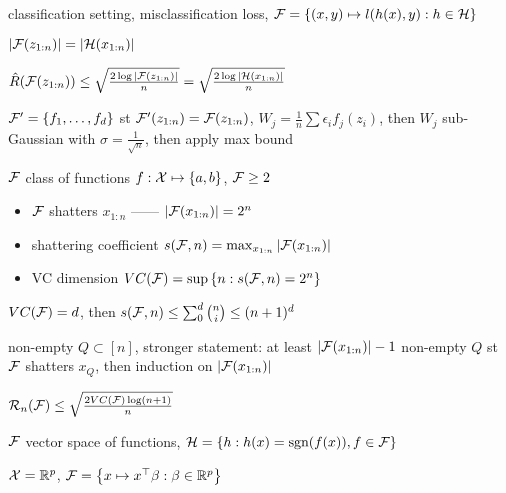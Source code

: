 \begin{setting}
    classification setting, misclassification loss, $\mathcal{F} = \left\{ (x, y) \mapsto l(h(x), y) : h \in \mathcal{H}\right\}$
\end{setting}
\begin{fact}
    $|\mathcal{F}(z_{1:n})| = |\mathcal{H}(x_{1:n})|$
\end{fact}

\begin{lemma}
    $\hat R(\mathcal{F}(z_{1:n})) \leq \sqrt{\frac{2 \log |\mathcal{F}(z_{1:n})|}{n}} = \sqrt{\frac{2 \log |\mathcal{H}(x_{1:n})|}{n}}$
\end{lemma}
\begin{pf}
    $\mathcal{F}' = \left\{ f_1, \dots, f_d \right\}$ st $\mathcal{F}'(z_{1:n}) = \mathcal{F}(z_{1:n})$, $W_j = \frac{1}{n} \sum \epsilon_i f_j(z_i)$,
    then $W_j$ sub-Gaussian with $\sigma = \frac{1}{\sqrt{n}}$, then apply max bound
\end{pf}

\begin{setting}
    $\mathcal{F}$ class of functions $f : \mathcal{X} \mapsto \left\{ a, b \right\}$, $\mathcal{F} \geq 2$
\end{setting}

\begin{itemize}
    \item $\mathcal{F}$ shatters $x_{1:n}$ ------ $|\mathcal{F}(x_{1:n})| = 2^n$
    \item shattering coefficient $s(\mathcal{F}, n) = \max_{x_{1:n}} |\mathcal{F}(x_{1:n})|$
    \item VC dimension $VC(\mathcal{F}) = \sup \left\{ n : s(\mathcal{F}, n) = 2^n \right\}$
\end{itemize}

\begin{lemma}
    $VC(\mathcal{F}) = d$, then $s(\mathcal{F}, n) \leq \sum_0^d {n \choose i} \leq (n+1)^d$
\end{lemma}
\begin{pf}
    non-empty $Q \subset [n]$, stronger statement: at least $|\mathcal{F}(x_{1:n})| - 1$ non-empty $Q$ st $\mathcal{F}$ shatters $x_Q$,
    then induction on $|\mathcal{F}(x_{1:n})|$
\end{pf}

\begin{fact}
    $\mathcal{R}_n(\mathcal{F}) \leq \sqrt{\frac{2 VC(\mathcal{F}) \log(n+1)}{n}}$
\end{fact}

\begin{setting}
    $\mathcal{F}$ vector space of functions, $\mathcal{H} = \left\{ h : h(x) = \textnormal{sgn}(f(x)), f\in \mathcal{F} \right\}$
\end{setting}
\begin{example}
    $\mathcal{X} = \mathbb{R}^p$, $\mathcal{F} = \left\{ x \mapsto x^\top \beta : \beta \in \mathbb{R}^p \right\}$
\end{example}

